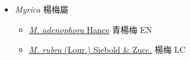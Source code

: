
  \begin{itemize}
 \item[] \textit{Myrica} 楊梅屬
                    
  \begin{itemize}
        \item[] \href{http://www.theplantlist.org/tpl1.1/search?q=Myrica+adenophora}{\textit{M. adenophora} Hance}   青楊梅 EN
        \item[] \href{http://www.theplantlist.org/tpl1.1/search?q=Myrica+rubra}{\textit{M. rubra} (Lour.) Siebold \& Zucc.}   楊梅 LC
  \end{itemize}
  \end{itemize}
